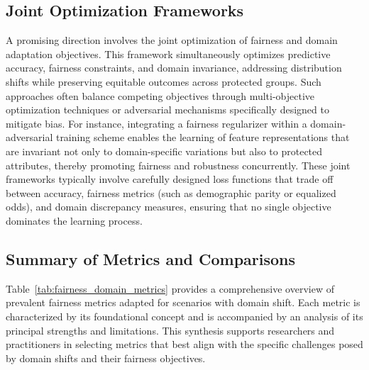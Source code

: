 \documentclass[sigconf]{acmart}
\begin{document}
\subsection{Joint Optimization Frameworks}
A promising direction involves the joint optimization of fairness and domain adaptation objectives. This framework simultaneously optimizes predictive accuracy, fairness constraints, and domain invariance, addressing distribution shifts while preserving equitable outcomes across protected groups. Such approaches often balance competing objectives through multi-objective optimization techniques or adversarial mechanisms specifically designed to mitigate bias. For instance, integrating a fairness regularizer within a domain-adversarial training scheme enables the learning of feature representations that are invariant not only to domain-specific variations but also to protected attributes, thereby promoting fairness and robustness concurrently. These joint frameworks typically involve carefully designed loss functions that trade off between accuracy, fairness metrics (such as demographic parity or equalized odds), and domain discrepancy measures, ensuring that no single objective dominates the learning process.

\subsection{Summary of Metrics and Comparisons}
Table~\ref{tab:fairness_domain_metrics} provides a comprehensive overview of prevalent fairness metrics adapted for scenarios with domain shift. Each metric is characterized by its foundational concept and is accompanied by an analysis of its principal strengths and limitations. This synthesis supports researchers and practitioners in selecting metrics that best align with the specific challenges posed by domain shifts and their fairness objectives.
\end{document}
